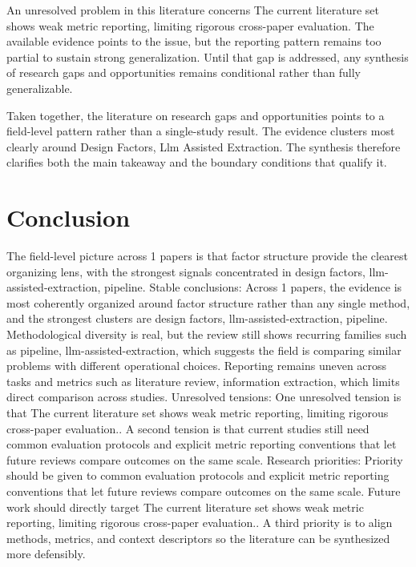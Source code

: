 \documentclass{article}
\begin{document}
An unresolved problem in this literature concerns The current literature set shows weak metric reporting, limiting rigorous cross-paper evaluation. The available evidence points to the issue, but the reporting pattern remains too partial to sustain strong generalization. Until that gap is addressed, any synthesis of research gaps and opportunities remains conditional rather than fully generalizable. \cite{01_2001_hamed_safety_science}

Taken together, the literature on research gaps and opportunities points to a field-level pattern rather than a single-study result. The evidence clusters most clearly around Design Factors, Llm Assisted Extraction. The synthesis therefore clarifies both the main takeaway and the boundary conditions that qualify it. \cite{01_2001_hamed_safety_science}

\section{Conclusion}
The field-level picture across 1 papers is that factor structure provide the clearest organizing lens, with the strongest signals concentrated in design factors, llm-assisted-extraction, pipeline. Stable conclusions: Across 1 papers, the evidence is most coherently organized around factor structure rather than any single method, and the strongest clusters are design factors, llm-assisted-extraction, pipeline. Methodological diversity is real, but the review still shows recurring families such as pipeline, llm-assisted-extraction, which suggests the field is comparing similar problems with different operational choices. Reporting remains uneven across tasks and metrics such as literature review, information extraction, which limits direct comparison across studies. Unresolved tensions: One unresolved tension is that The current literature set shows weak metric reporting, limiting rigorous cross-paper evaluation.. A second tension is that current studies still need common evaluation protocols and explicit metric reporting conventions that let future reviews compare outcomes on the same scale. Research priorities: Priority should be given to common evaluation protocols and explicit metric reporting conventions that let future reviews compare outcomes on the same scale. Future work should directly target The current literature set shows weak metric reporting, limiting rigorous cross-paper evaluation.. A third priority is to align methods, metrics, and context descriptors so the literature can be synthesized more defensibly. \cite{01_2001_hamed_safety_science}
\end{document}

